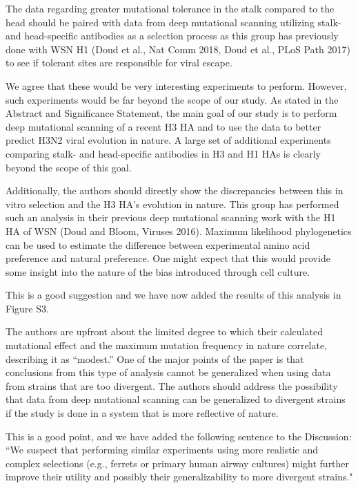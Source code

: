 \documentclass[11pt, oneside]{article}   	%
\newcommand{\response}[1]{{\color{black}#1}}
\begin{document}
The data regarding greater mutational tolerance in the stalk compared to the head should be paired with data from deep mutational scanning utilizing stalk- and head-specific antibodies as a selection process as this group has previously done with WSN H1 (Doud et al., Nat Comm 2018, Doud et al., PLoS Path 2017) to see if tolerant sites are responsible for viral escape. 

\response{We agree that these would be very interesting experiments to perform.
However, such experiments would be far beyond the scope of our study.
As stated in the Abstract and Significance Statement, the main goal of our study is to perform deep mutational scanning of a recent H3 HA and to use the data to better predict H3N2 viral evolution in nature.
A large set of additional experiments comparing stalk- and head-specific antibodies in H3 and H1 HAs is clearly beyond the scope of this goal.
}

Additionally, the authors should directly show the discrepancies between this in vitro selection and the H3 HA's evolution in nature. This group has performed such an analysis in their previous deep mutational scanning work with the H1 HA of WSN (Doud and Bloom, Viruses 2016). Maximum likelihood phylogenetics can be used to estimate the difference between experimental amino acid preference and natural preference. One might expect that this would provide some insight into the nature of the bias introduced through cell culture. 

\response{This is a good suggestion and we have now added the results of this analysis in Figure S3.
}

The authors are upfront about the limited degree to which their calculated mutational effect and the maximum mutation frequency in nature correlate, describing it as ``modest.'' One of the major points of the paper is that conclusions from this type of analysis cannot be generalized when using data from strains that are too divergent. The authors should address the possibility that data from deep mutational scanning can be generalized to divergent strains if the study is done in a system that is more reflective of nature. 

\response{This is a good point, and we have added the following sentence to the Discussion: ``We suspect that performing similar experiments using more realistic and complex selections (e.g., ferrets or primary human airway cultures) might further improve their utility and possibly their generalizability to more divergent strains."}
\end{document}
